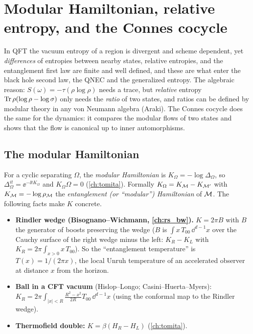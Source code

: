 \section{Modular Hamiltonian, relative entropy, and the Connes cocycle}\label{ch:modham}

\begin{physmotiv}
In QFT the vacuum entropy of a region is divergent and scheme dependent, yet \emph{differences} of entropies between nearby states, relative entropies, and the entanglement first law are finite and well defined, and these are what enter the black hole second law, the QNEC and the generalized entropy. The algebraic reason: $S(\omega)=-\tau(\rho\log\rho)$ needs a trace, but \emph{relative} entropy $\operatorname{Tr}\rho(\log\rho-\log\sigma)$ only needs the \emph{ratio} of two states, and ratios can be defined by modular theory in any von Neumann algebra (Araki). The Connes cocycle does the same for the dynamics: it compares the modular flows of two states and shows that the flow is canonical up to inner automorphisms.
\end{physmotiv}

\subsection{The modular Hamiltonian}

For a cyclic separating $\Omega$, the \emph{modular Hamiltonian} is $K_\Omega=-\log\Delta_\Omega$, so $\Delta_\Omega^{it}=\ee^{-\ii tK_\Omega}$ and $K_\Omega\Omega=0$ (\cref{ch:tomita}). Formally $K_\Omega=K_{\mathcal{M}}-K_{\mathcal{M}'}$ with $K_{\mathcal{M}}=-\log\rho_{\mathcal{M}}$ the \emph{entanglement (or ``modular'') Hamiltonian} of $\mathcal{M}$. The following facts make $K$ concrete.

\begin{itemize}
\item \textbf{Rindler wedge (Bisognano--Wichmann, \cref{ch:rs_bw}).} $K=2\pi B$ with $B$ the generator of boosts preserving the wedge ($B$ is $\int x\,T_{00}\,\dd^{d-1}x$ over the Cauchy surface of the right wedge minus the left: $K_R-K_L$ with $K_R=2\pi\int_{x>0}x\,T_{00}$). So the ``entanglement temperature'' is $T(x)=1/(2\pi x)$, the local Unruh temperature of an accelerated observer at distance $x$ from the horizon.
\item \textbf{Ball in a CFT vacuum} (Hislop--Longo; Casini--Huerta--Myers): $K_R=2\pi\int_{|x|<R}\frac{R^2-x^2}{2R}T_{00}\,\dd^{d-1}x$ (using the conformal map to the Rindler wedge).
\item \textbf{Thermofield double:} $K=\beta(H_R-H_L)$ (\cref{ch:tomita}).
\end{itemize}


